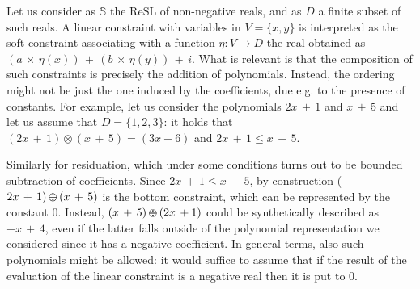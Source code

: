 \documentclass{llncs}
\newcommand{\comment}[1]{}
\def\monop{\otimes}
\def\odiv{\, {\ominus\hspace{-7.7pt} \div} \,}
\begin{document}
\begin{example}\label{execlim}
	Let us consider as $\mathbb S$ the ReSL of non-negative reals, 
	and as $D$ a finite subset of such reals.
	A linear constraint with variables in $V = \{x,y\}$ 
	is interpreted as the soft constraint associating 
	with a function $\eta: V \rightarrow D$ the real 
	obtained as $(a \, \times \, \eta(x)) \, + \, (b \, \times \, \eta(y)) \, + \, i$.
	What is relevant is that the composition of such constraints is precisely 
	the addition of polynomials.
	Instead, the ordering might not be just the one induced 
	by the coefficients, due e.g. to the presence of constants.
	For example, let us consider the polynomials $2x \, + \, 1$ and $x \, + \, 5$
	and let us assume that $D = \{1, 2, 3\}$: it holds that
	$(2x \, + \, 1)\monop (x \, + \, 5) = (3x + 6)$ and  
	$2x \, + \, 1 \leq x \, + \, 5$.
	
	Similarly for residuation, which under some conditions turns out to be bounded subtraction of coefficients.
	Since $2x \, + \, 1 \leq x \, + \, 5$,
	by construction ($2x \, + \, 1) \odiv (x \, + \, 5)$ is the bottom constraint,
	which can be represented by the constant $0$.
	Instead, $(x \, + \, 5) \odiv (2x \, + 1)$ could be synthetically
	described as $-x \, + \, 4$, even if
	the latter falls outside of the polynomial representation we considered since it has a negative coefficient.
	In general terms, also such polynomials might be allowed: 
	it would suffice to assume that if the result of the evaluation of the linear constraint 
	is a negative real then it is put to $0$.
\end{example}
\comment{
The support of (the image along $\xi$ of) a linear constraint is dependent on the support of $p$ (as expected)
as well as on $i$.
%
%
Thus, only a minimal result can be stated.

\begin{lemma}[Support]
Let $\langle p, i \rangle$ be a linear constraint. Then $supp(\xi(p,i)) \subseteq supp(p)$.
\end{lemma}

Clearly, no $y \not \in supp(p)$ belongs to $supp(\xi(p,i))$,
%
while for any $x \in supp(p)$ it at least depends on the element 
$i$, which might e.g. be the top of the monoid.
}
\end{document}
